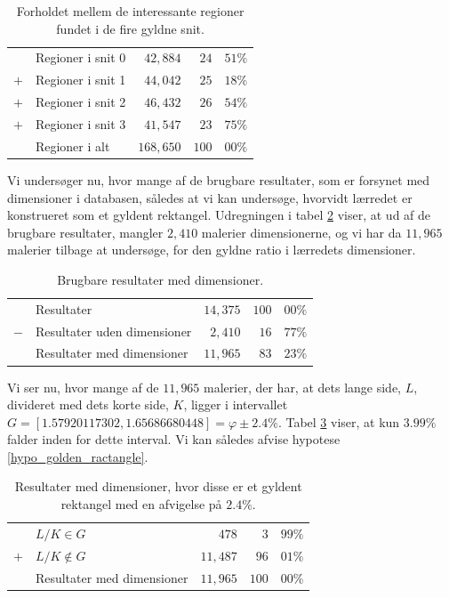 {\begin{table}[H]
    \centering
    \begin{tabular}{r@{\ \ }p{12em}r|r@{.}l}
            & Regioner i snit 0   &  $42,884$ &  $24$ & $51\%$ \\
        $+$ & Regioner i snit 1   &  $44,042$ &  $25$ & $18\%$ \\
        $+$ & Regioner i snit 2   &  $46,432$ &  $26$ & $54\%$ \\
        $+$ & Regioner i snit 3   &  $41,547$ &  $23$ & $75\%$ \\\hline
            & Regioner i alt      & $168,650$ & $100$ & $00\%$
    \end{tabular}
    \caption[]{Forholdet mellem de interessante regioner fundet i de
    fire gyldne snit.}
    \label{tabel_fire_snit}
\end{table}

Vi undersøger nu, hvor mange af de brugbare resultater, som er forsynet
med dimensioner i databasen, således at vi kan undersøge, hvorvidt
lærredet er konstrueret som et gyldent rektangel. Udregningen i tabel
\ref{tabel_med_dimensioner} viser, at ud af de brugbare resultater,
mangler $2,410$ malerier dimensionerne, og vi har da $11,965$ malerier
tilbage at undersøge, for den gyldne ratio i lærredets dimensioner.

\begin{table}[H]
    \centering
    \begin{tabular}{r@{\ \ }p{14em}r|r@{.}l}
            & Resultater                     & $14,375$ & $100$ & $00\%$ \\
        $-$ & Resultater uden dimensioner    &  $2,410$ &  $16$ & $77\%$ \\\hline
            & Resultater med dimensioner     & $11,965$ &  $83$ & $23\%$
    \end{tabular}
    \caption[]{Brugbare resultater med dimensioner.}
    \label{tabel_med_dimensioner}
\end{table}

Vi ser nu, hvor mange af de $11,965$ malerier, der har, at dets lange
side, $L$, divideret med dets korte side, $K$, ligger i intervallet $G =
[1.57920117302, 1.65686680448] = \varphi \pm 2.4\%$. Tabel
\ref{tabel_real_dimensions} viser, at kun $3.99\%$ falder inden for
dette interval. Vi kan således afvise hypotese
\ref{hypo_golden_ractangle}.

\begin{table}[H]
    \centering
    \begin{tabular}{r@{\ \ }p{14em}r|r@{.}l}
            & $L/K \in G$                  &    $478$ &   $3$ & $99\%$ \\
        $+$ & $L/K \notin G$               & $11,487$ &  $96$ & $01\%$ \\\hline
            & Resultater med dimensioner   & $11,965$ & $100$ & $00\%$
    \end{tabular}
    \caption[]{Resultater med dimensioner, hvor disse er et gyldent
    rektangel med en afvigelse på $2.4\%$.}
    \label{tabel_real_dimensions}
\end{table}

}

